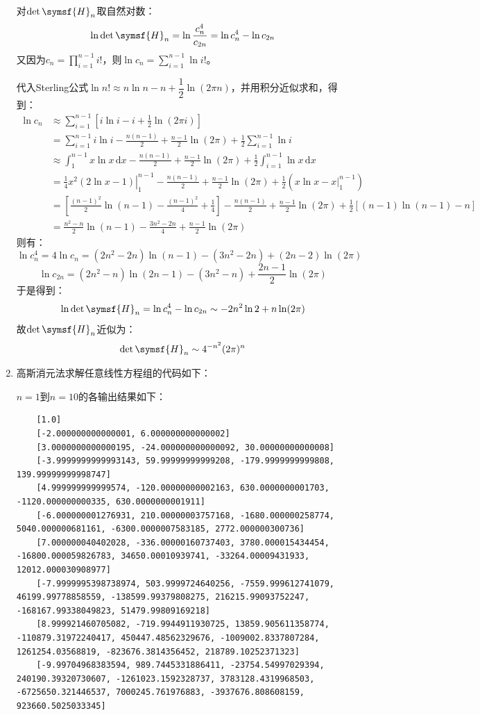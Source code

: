 \documentclass[a4paper]{article}
\renewcommand\mathsf{\symsf}
\begin{document}
\begin{enumerate}
对$\det\mathsf{H}_n$取自然对数：
\[
    \ln\det\mathsf{H}_n = \ln\frac{c_n^4}{c_{2n}} = \ln c_n^4 - \ln c_{2n}
\]
又因为$c_n=\prod\limits_{i=1}^{n-1} i!$，则$\ln c_n = \sum_{i=1}^{n-1} \ln i!$。

代入Sterling公式$\ln n!\approx n\ln n-n+\dfrac{1}{2}\ln(2\pi n)$，并用积分近似求和，得到：
\begin{align*}
    \ln c_n
    &\approx \sum_{i=1}^{n-1} \left[i\ln i - i + \frac{1}{2}\ln(2\pi i)\right] \\
    &= \sum_{i=1}^{n-1} i\ln i - \frac{n(n-1)}{2} + \frac{n-1}{2}\ln(2\pi) + \frac{1}{2}\sum_{i=1}^{n-1}\ln i \\
    &\approx \int_1^{n-1} x\ln x\,\mathrm{d}x - \frac{n(n-1)}{2} + \frac{n-1}{2}\ln(2\pi) + \frac{1}{2}\int_{i=1}^{n-1}\ln x\,\mathrm{d}x \\
    &= \left.\frac{1}{4}x^2(2\ln x - 1)\right|_1^{n-1} - \frac{n(n-1)}{2} + \frac{n-1}{2}\ln(2\pi) + \frac{1}{2}\left(\left.x\ln x - x\right|_1^{n-1}\right) \\
    &= \left[\frac{(n-1)^2}{2}\ln(n-1)-\frac{(n-1)^2}{4}+\frac{1}{4}\right] - \frac{n(n-1)}{2} + \frac{n-1}{2}\ln(2\pi) + \frac{1}{2}\left[(n-1)\ln(n-1)-n\right] \\
    &= \frac{n^2-n}{2}\ln(n-1) - \frac{3n^2-2n}{4} + \frac{n-1}{2}\ln(2\pi)
\end{align*}
则有：
\[
    \ln c_n^4 = 4\ln c_n = (2n^2-2n)\ln(n-1) - (3n^2-2n) + (2n-2)\ln(2\pi)
\]
\[
    \ln c_{2n} = (2n^2-n)\ln(2n-1) - (3n^2-n) + \frac{2n-1}{2}\ln(2\pi)
\]
于是得到：
\[
    \ln\det\mathsf{H}_n = \ln c_n^4 - \ln c_{2n} \sim -2n^2\ln2 + n\ln(2\pi)
\]
故$\det\mathsf{H}_n$近似为：
\[
    \det\mathsf{H}_n \sim 4^{-n^2}(2\pi)^n
\]

\item[3.(d)]

高斯消元法求解任意线性方程组的代码如下：



$n=1$到$n=10$的各输出结果如下：

\begin{lstlisting}
    [1.0]
    [-2.000000000000001, 6.000000000000002]
    [3.0000000000000195, -24.000000000000092, 30.00000000000008]
    [-3.9999999999993143, 59.99999999999208, -179.9999999999808, 139.99999999998747]
    [4.999999999999574, -120.00000000002163, 630.0000000001703, -1120.000000000335, 630.0000000001911]
    [-6.000000001276931, 210.00000003757168, -1680.000000258774, 5040.000000681161, -6300.0000007583185, 2772.000000300736]
    [7.000000040402028, -336.00000160737403, 3780.000015434454, -16800.000059826783, 34650.00010939741, -33264.00009431933, 12012.000030908977]
    [-7.9999995398738974, 503.9999724640256, -7559.999612741079, 46199.99778858559, -138599.99379808275, 216215.99093752247, -168167.99338049823, 51479.99809169218]
    [8.999921460705082, -719.9944911930725, 13859.905611358774, -110879.31972240417, 450447.48562329676, -1009002.8337807284, 1261254.03568819, -823676.3814356452, 218789.10252371323]
    [-9.99704968383594, 989.7445331886411, -23754.54997029394, 240190.39320730607, -1261023.1592328737, 3783128.4319968503, -6725650.321446537, 7000245.761976883, -3937676.808608159, 923660.5025033345]
\end{lstlisting}


\end{enumerate}
\end{document}
